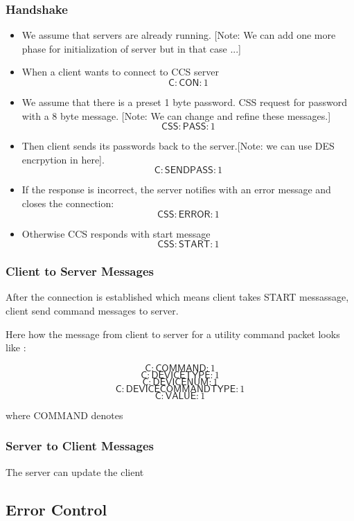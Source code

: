 \subsubsection{Handshake}
\label{sec:pdus:pdu:hs}
\begin{itemize}
\item We assume that servers are already running. [Note: We can add one more phase for initialization of server but in that case ...]
\item When a client wants to connect to \textsf{CCS} server
  \[ \textsf{C} : \textsf{CON} : 1\]
\item We assume that there is a preset 1 byte password. \textsf{CSS} request for password with a 8 byte message. [Note: We can change and refine these messages.]
  \[\textsf{CSS} : \textsf{PASS} : 1\]
  \item Then client sends its passwords back to the server.[Note: we can use DES encrpytion in here]. 
    \[\textsf{C} : \textsf{SENDPASS} : 1\]
  \item If the response is incorrect, the server notifies with an error message and closes the connection:
    \[\textsf{CSS}:\textsf{ERROR}:1\]
    \item Otherwise \textsf{CCS} responds with start message
      \[\textsf{CSS} : \textsf{START} : 1\]
    \end{itemize}

\subsubsection{Client to Server Messages}
\label{sec:pdus:pdu:c_to_s}

After the connection is established which means client takes \textsf{START} messassage, client send command messages to server. 

Here how the message from client to server for a utility command packet looks like :

\[\textsf{C}:\textsf{COMMAND}:1\]
\[\textsf{C}:\textsf{DEVICETYPE}:1\]
\[\textsf{C}:\textsf{DEVICENUM}:1\]
\[\textsf{C}:\textsf{DEVICECOMMANDTYPE}:1\]
\[\textsf{C}:\textsf{VALUE}:1\]

where \textsf{COMMAND} denotes 
\subsubsection{Server to Client Messages}
\label{sec:pdus:pdu:s_to_c}

The server can update the client 
\subsection{Error Control}
\label{sec:pdus:err}



